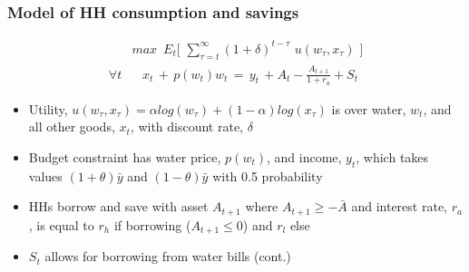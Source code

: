 \documentclass[aspectratio=149]{beamer}
\begin{document}
\begin{frame}
\frametitle{Model of HH consumption and savings}

\begin{align*}\label{eq:u}
&max \, \, \, E_t \Big[ \, \, \sum_{\tau = t}^{\infty} (1+\delta)^{t-\tau} \,\, u(w_{\tau},x_{\tau}) \, \, \Big] \\
\forall t &\,\,\,\,\,x_t \, + \, p(w_t) w_t \, = \, y_t \, + A_t - \frac{ A_{t+1} }{1+r_a} + S_t
\end{align*}

\begin{itemize}
\item Utility, $u(w_{\tau},x_{\tau}) =\alpha log( w_{\tau}) + (1-\alpha) log(x_{\tau})$ is over water, $w_t$, and all other goods, $x_t$, with discount rate, $\delta$
\vspace{.5mm}
\item Budget constraint has water price, $p(w_t)$, and income, $y_t$, which takes values $(1+\theta)\bar{y}$ and $(1-\theta)\bar{y}$ with 0.5 probability
\vspace{.5mm}
\item HHs borrow and save with asset $A_{t+1}$ where $A_{t+1}\geq -\bar{A}$ and interest rate, $r_a$, is  equal to $r_h$ if borrowing ($A_{t+1}\leq 0$) and $r_l$ else
\vspace{.5mm}
\item $S_t$ allows for borrowing from water bills (cont.)
\end{itemize}

\end{frame}
\end{document}
